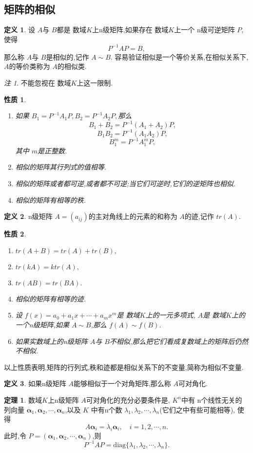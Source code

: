 \documentclass[a4paper,11pt]{article}%
\theoremstyle{remark}
\newtheorem*{remark}{注}
\theoremstyle{definition}
\newtheorem{theorem}{定理}[section]
\theoremstyle{definition}
\newtheorem*{definition}{定义}
\theoremstyle{plain}
\newtheorem*{property}{性质}
\begin{document}
\subsection{矩阵的相似}
\begin{definition}
    设 $A$与 $B$都是 数域$K$上n级矩阵,如果存在 数域$K$上一个 n级可逆矩阵 $P$,
    使得
    \[P^{-1}AP=B,\]
    那么称 $A$与 $B$是相似的,记作 $A\sim B.$
    容易验证相似是一个等价关系,在相似关系下, $A$的等价类称为 $A$的相似类.
\end{definition}
\begin{remark}
    不能忽视在 数域$K$上这一限制.
\end{remark}
\begin{property}
    \begin{enumerate}
        \item 如果 $B_1=P^{-1}A_1P,B_2=P^{-1}A_2P,$那么
        \[B_1+B_2=P^{-1}(A_1+A_2)P,\]
        \[B_1B_2=P^{-1}(A_1A_2)P,\]
        \[B_1^m=P^{-1}A_1^mP,\]
        其中 $m$是正整数.
        \item 相似的矩阵其行列式的值相等.
        \item 相似的矩阵或者都可逆,或者都不可逆;当它们可逆时,它们的逆矩阵也相似.
        \item 相似的矩阵有相等的秩. 
    \end{enumerate}
\end{property}
\begin{definition}
    n级矩阵 $A=(a _{ij})$的主对角线上的元素的和称为 $A$的迹,记作 $tr(A)$.
\end{definition}
\begin{property}
    \begin{enumerate}
        \item $tr(A+B)=tr(A)+tr(B),$
        \item $tr(kA)=ktr(A),$
        \item $tr(AB)=tr(BA).$
        \item 相似的矩阵有相等的迹.
        \item 设 $f(x)=a_0+a_1x+\cdots+a_mx^m$是 数域$K$上的一元多项式, $A$是 数域$K$上的一个n级矩阵,如果 $A\sim B$,那么 $f(A)\sim f(B).$
        \item 如果实数域上的n级矩阵 $A$与 $B$不相似,那么把它们看成复数域上的矩阵后仍然不相似.
    \end{enumerate}
\end{property}
以上性质表明,矩阵的行列式,秩和迹都是相似关系下的不变量,简称为相似不变量.
\begin{definition}
    如果n级矩阵 $A$能够相似于一个对角矩阵,那么称 $A$可对角化.
\end{definition}
\begin{theorem}
    数域$K$上n级矩阵 $A$可对角化的充分必要条件是, $K^n$中有 n个线性无关的
    列向量 $\bm{\alpha}_1,\bm{\alpha}_2,\cdots,\bm{\alpha}_n$,以及 $K$
    中有n个数 $\lambda_1,\lambda_2,\cdots,\lambda_n$(它们之中有些可能相等),
    使得
    \[A \bm{\alpha}_i=\lambda_i \bm{\alpha}_i,\phantom{11}i=1,2,\cdots,n.\]
    此时,令 $P=(\bm{\alpha}_1,\bm{\alpha}_2,\cdots,\bm{\alpha}_n)$,则
    \[P^{-1}AP=\text{diag}\{\lambda_1,\lambda_2,\cdots,\lambda_n\}.\]
\end{theorem}
\end{document}
